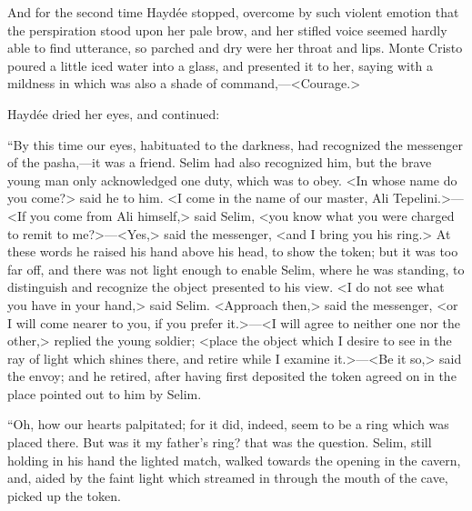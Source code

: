  And for the second time Haydée stopped, overcome by such violent emotion that the perspiration stood upon her pale brow, and her stifled voice seemed hardly able to find utterance, so parched and dry were her throat and lips.  Monte Cristo poured a little iced water into a glass, and presented it to her, saying with a mildness in which was also a shade of command,—<Courage.> 

 Haydée dried her eyes, and continued: 

 “By this time our eyes, habituated to the darkness, had recognized the messenger of the pasha,—it was a friend. Selim had also recognized him, but the brave young man only acknowledged one duty, which was to obey. <In whose name do you come?> said he to him. <I come in the name of our master, Ali Tepelini.>—<If you come from Ali himself,> said Selim, <you know what you were charged to remit to me?>—<Yes,> said the messenger, <and I bring you his ring.> At these words he raised his hand above his head, to show the token; but it was too far off, and there was not light enough to enable Selim, where he was standing, to distinguish and recognize the object presented to his view. <I do not see what you have in your hand,> said Selim. <Approach then,> said the messenger, <or I will come nearer to you, if you prefer it.>—<I will agree to neither one nor the other,> replied the young soldier; <place the object which I desire to see in the ray of light which shines there, and retire while I examine it.>—<Be it so,> said the envoy; and he retired, after having first deposited the token agreed on in the place pointed out to him by Selim. 

 “Oh, how our hearts palpitated; for it did, indeed, seem to be a ring which was placed there. But was it my father's ring? that was the question. Selim, still holding in his hand the lighted match, walked towards the opening in the cavern, and, aided by the faint light which streamed in through the mouth of the cave, picked up the token. 

